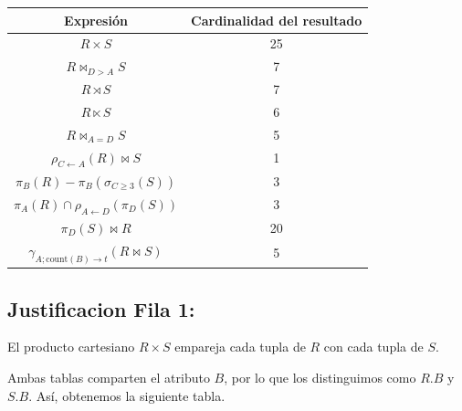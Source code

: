 \begin{center}
\begin{tabular}{|c|c|}
  \hline
  \textbf{Expresión} & \textbf{Cardinalidad del resultado} \\ \hline
  $R \times S$ & \multicolumn{1}{c|}{25} \\ \hline
  $R \bowtie_{D > A} S$ & \multicolumn{1}{c|}{7} \\ \hline
  $R \rtimes S$ & \multicolumn{1}{c|}{7} \\ \hline
  $R \ltimes S$ & \multicolumn{1}{c|}{6} \\ \hline
  $R \bowtie_{A = D} S$ & \multicolumn{1}{c|}{5} \\ \hline
  $\rho_{C \leftarrow A}(R) \bowtie S$ & \multicolumn{1}{c|}{1} \\ \hline
  $\pi_B(R) - \pi_B(\sigma_{C \ge 3}(S))$ & \multicolumn{1}{c|}{3} \\ \hline
  $\pi_A(R) \cap \rho_{A \leftarrow D}(\pi_D(S))$ & \multicolumn{1}{c|}{3} \\ \hline
  $\pi_D(S) \bowtie R$ & \multicolumn{1}{c|}{20} \\ \hline
  $\gamma_{A; \text{count}(B) \rightarrow t}(R \bowtie S)$ & \multicolumn{1}{c|}{5} \\ \hline
\end{tabular}
\end{center}

\subsection*{Justificacion Fila 1:}

El producto cartesiano $R \times S$ empareja cada tupla de $R$ con cada tupla de $S$.

Ambas tablas comparten el atributo $B$, por lo que los distinguimos como $R.B$ y $S.B$. Así, obtenemos la siguiente tabla.

